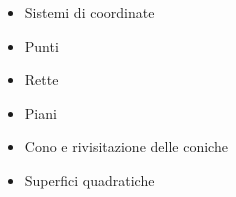 \documentclass[letterpaper,10pt,english]{jupyterBook}
\begin{document}
\sphinxAtStartPar
{}
\begin{itemize}
\item {} 
\sphinxAtStartPar
Sistemi di coordinate

\item {} 
\sphinxAtStartPar
Punti

\item {} 
\sphinxAtStartPar
Rette

\item {} 
\sphinxAtStartPar
Piani

\item {} 
\sphinxAtStartPar
Cono e rivisitazione delle coniche

\item {} 
\sphinxAtStartPar
Superfici quadratiche

\end{itemize}



\sphinxstepscope
\end{document}
